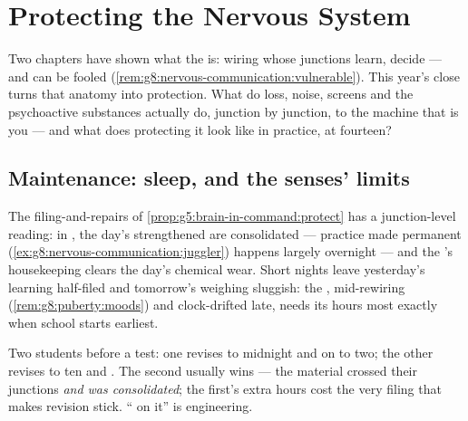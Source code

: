 \chapter{Protecting the Nervous System}\label{ch:g8:protecting-the-nervous-system}

Two chapters have shown what the  is: wiring
whose junctions learn, decide --- and can be fooled
(\cref{rem:g8:nervous-communication:vulnerable}). This
year's close turns that anatomy into protection. What do
 loss, noise, screens and the psychoactive substances
actually do, junction by junction, to the machine that is
you --- and what does protecting it look like in practice,
at fourteen?

\section{Maintenance: sleep, and the senses' limits}

\begin{proposition}\label{prop:g8:protecting-the-nervous-system:sleep}
The filing-and-repairs of
\cref{prop:g5:brain-in-command:protect} has a junction-level
reading: in , the day's strengthened  are
consolidated --- practice made permanent
(\cref{ex:g8:nervous-communication:juggler}) happens
largely overnight --- and the 's housekeeping clears
the day's chemical wear. Short nights leave yesterday's
learning half-filed and tomorrow's weighing sluggish: the
 , mid-rewiring
(\cref{rem:g8:puberty:moods}) and clock-drifted late,
needs its hours most exactly when school starts earliest.
\end{proposition}
\admitted

\begin{example}\label{ex:g8:protecting-the-nervous-system:revision}
Two students before a test: one revises to midnight and
on to two; the other revises to ten and . The
second usually wins --- the material crossed their
junctions \emph{and was consolidated}; the first's extra
hours cost the very filing that makes revision stick.
`` on it'' is  engineering.
\end{example}

